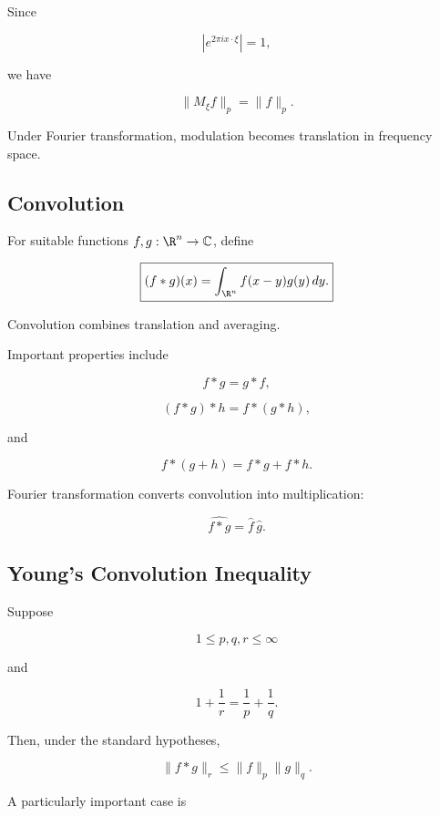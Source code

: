 Since

\[
|e^{2\pi i x\cdot\xi}|=1,
\]

we have

\[
\boxed{
\|M_\xi f\|_p
=
\|f\|_p.
}
\]

Under Fourier transformation, modulation becomes translation in
frequency space.

\subsection{Convolution}
\label{subsec:harmonic-convolution}

For suitable functions \(f,g:\R^n\to\mathbb{C}\), define

\[
\boxed{
(f*g)(x)
=
\int_{\R^n}
f(x-y)g(y)\,dy.
}
\]

Convolution combines translation and averaging.

Important properties include

\[
\boxed{
f*g=g*f,
}
\]

\[
\boxed{
(f*g)*h=f*(g*h),
}
\]

and

\[
\boxed{
f*(g+h)=f*g+f*h.
}
\]

Fourier transformation converts convolution into multiplication:

\[
\boxed{
\widehat{f*g}
=
\widehat{f}\,\widehat{g}.
}
\]

\subsection{Young's Convolution Inequality}
\label{subsec:young-harmonic}

\begin{theorem}
Suppose

\[
1\leq p,q,r\leq\infty
\]

and

\[
\boxed{
1+\frac1r
=
\frac1p+\frac1q.
}
\]

Then, under the standard hypotheses,

\[
\boxed{
\|f*g\|_r
\leq
\|f\|_p\|g\|_q.
}
\]
\end{theorem}

A particularly important case is

